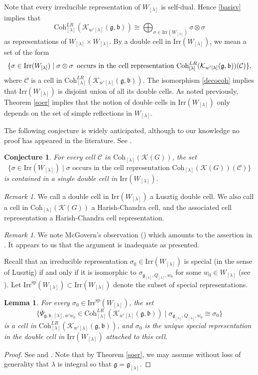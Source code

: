 \documentclass[12pt,a4paper]{amsart}
\newcommand{\CC}{{\mathcal {C}}}
\newcommand{\CK}{{\mathcal {K}}}
\newcommand{\g}{\mathfrak g}
\renewcommand{\b}{\mathfrak b}
\newcommand{\be}{\begin {equation}}
\newcommand{\ee}{\end {equation}}
\numberwithin{equation}{section}
\newtheorem{lem}[thm]{Lemma}
\newtheorem{conj}[thm]{Conjecture}
\theoremstyle{remark}
\newtheorem{remark}[thm]{Remark}
\def\Irr{\mathrm{Irr}}
\def\Coh{\mathrm{Coh}}
\newcommand{\Lam}{{[\lambda]}}
\begin{document}
Note that every irreducible representation of $W_\Lam$ is self-dual. Hence \eqref{basisv} implies that
\be\label{decocoh}
   \Coh^{LR}_{\Lam}( \CK_{w'\Lam}(\g,\b))\cong \bigoplus_{\sigma\in \Irr(W_\Lam)} \sigma\otimes \sigma
\ee
as representations of $W_\Lam\times W_\Lam$. By a double cell in  $\Irr(W_\Lam)$, we mean a set of the form
\[
  \{\sigma\in \Irr(W_\Lam)\mid \sigma\otimes \sigma\,  \textrm{ occurs in the cell representation $ \Coh^{LR}_{\Lam}( \CK_{w'\Lam}(\g,\b))(\mathcal C)$}\},
\]
where
 $\CC$ is a cell in  $ \Coh^{LR}_{\Lam}( \CK_{w'\Lam}(\g,\b))$. The isomorphism \eqref{decocoh} implies  that $\Irr(W_\Lam)$ is  disjoint union of
all its double cells. As noted previously, Theorem \ref{soer} implies that the notion of double cells in   $\Irr(W_\Lam)$ only depends on  the set of simple reflections in $W_\Lam$.

The following conjecture is widely anticipated, although to our knowledge no proof has appeared in the literature. See \cite[page 1055]{V4}.

\begin{conj}\label{conjcell}
For every cell $\CC$ in  $ \Coh_{\Lam}( \CK(G))$, the set
\[
 \{ \sigma\in \Irr(W_\Lam)\mid \sigma\textrm{ occurs in the cell representation $\Coh_{\Lam}( \CK(G))(\CC)$}\}
\]
is contained in a single double cell in $\Irr(W_\Lam)$.
\end{conj}


\begin{remark}
We call a double cell in  $\Irr(W_\Lam)$ a Lusztig double cell. We also call a cell in  $\Coh_{\Lam}( \CK(G))$ a Harish-Chandra cell, and the associated cell representation a Harish-Chandra cell representation.
\end{remark}

\begin{remark}
We note McGovern's observation (\cite[Page 213]{Mc}) which amounts to the assertion in . It appears to us that the argument is inadequate as presented.
\end{remark}

Recall that an irreducible representation $\sigma_0\in \Irr(W_\Lam)$ is special (in the sense of Lusztig) if and only if it is isomorphic to $\sigma_{\g_\Lam,Q_\Lam,w_0}$ for some $w_0\in W_\Lam$ (see \cite[Theorem 1.1]{BV2}). Let $ \Irr^{\mathrm{sp}}(W_\Lam)\subset  \Irr(W_\Lam)$ denote the subset of special representations.


\begin{lem}\label{doublecell0}
For every $\sigma_0\in  \Irr^{\mathrm{sp}}(W_\Lam)$, the set
\[
  \{ \overline \Psi_{\g,\b, \Lam, w'w_0}\in \Coh^{LR}_{\Lam}( \CK_{ w'\Lam}(\g,\b))\mid \sigma_{\g_\Lam, Q_\Lam, w_0}\cong \sigma_0 \}
\]
is a cell in $\Coh^{LR}_{\Lam}( \CK_{ w'\Lam}(\g,\b))$, and $\sigma_0$ is the unique special representation in the double cell in $\Irr(W_\Lam)$ attached to this cell.
\end{lem}
\begin{proof}
See \cite[Theorem 2.6 and Corollary 2.16]{BV2} and  \cite[Corollary 14.11]{V4}. Note that by Theorem \ref{soer}, we may assume without loss of generality that $\lambda$ is integral so that $\g=\g_\Lam$.
\end{proof}
\end{document}
